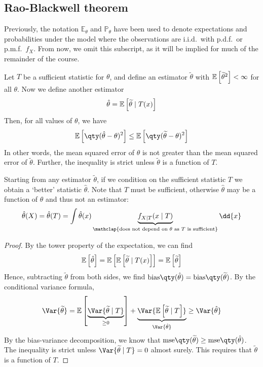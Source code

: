 \subsection{Rao-Blackwell theorem}
Previously, the notation $\mathbb E_\theta$ and $\mathbb P_\theta$ have been used to denote expectations and probabilities under the model where the observations are i.i.d.\ with p.d.f.\ or p.m.f.\ $f_X$.
From now, we omit this subscript, as it will be implied for much of the remainder of the course.
\begin{theorem}
	Let $T$ be a sufficient statistic for $\theta$, and define an estimator $\widetilde \theta$ with $\mathbb{E}\left[{{\widetilde \theta}^2}\right] < \infty$ for all $\theta$.
	Now we define another estimator
	\begin{align*}
		\hat \theta = \mathbb{E}\left[{\widetilde \theta \mid T(x)}\right]
	\end{align*}
	Then, for all values of $\theta$, we have
	\begin{align*}
		\expect{\qty(\hat \theta - \theta)^2} \leq \expect{\qty(\widetilde \theta - \theta)^2}
	\end{align*}
	In other words, the mean squared error of $\hat \theta$ is not greater than the mean squared error of $\widetilde \theta$.
	Further, the inequality is strict unless $\widetilde \theta$ is a function of $T$.
\end{theorem}
\begin{remark}
	Starting from any estimator $\widetilde \theta$, if we condition on the sufficient statistic $T$ we obtain a `better' statistic $\hat \theta$.
	Note that $T$ must be sufficient, otherwise $\hat \theta$ may be a function of $\theta$ and thus not an estimator:
	\begin{align*}
		\hat \theta(X) = \hat \theta(T) = \int \hat \theta(x) \underbrace{f_{X \mid T}(x \mid T)}_{\mathclap{\text{does not depend on } \theta \text{ as } T \text{ is sufficient}}} \dd{x}
	\end{align*}
\end{remark}
\begin{proof}
	By the tower property of the expectation, we can find
	\begin{align*}
		\mathbb{E}\left[{\hat \theta}\right] = \mathbb{E}\left[{\mathbb{E}\left[{\widetilde \theta \mid T(x)}\right]}\right] = \mathbb{E}\left[{\widetilde \theta}\right]
	\end{align*}
	Hence, subtracting $\widetilde \theta$ from both sides, we find $\mathrm{bias}\qty(\hat\theta) = \mathrm{bias}\qty(\widetilde\theta)$.
	By the conditional variance formula,
	\begin{align*}
		\Var{\widetilde \theta} = \expect{\underbrace{\Var{\widetilde \theta \mid T}}_{\geq 0}} + \underbrace{\Var{\expect{\widetilde \theta \mid T}}}_{\Var{\hat\theta}} \geq \Var{\hat \theta}
	\end{align*}
	By the bias-variance decomposition, we know that $\mathrm{mse}\qty(\widetilde \theta) \geq \mathrm{mse}\qty(\hat \theta)$.
	The inequality is strict unless $\Var{\widetilde \theta \mid T} = 0$ almost surely.
	This requires that $\widetilde \theta$ is a function of $T$.
\end{proof}
